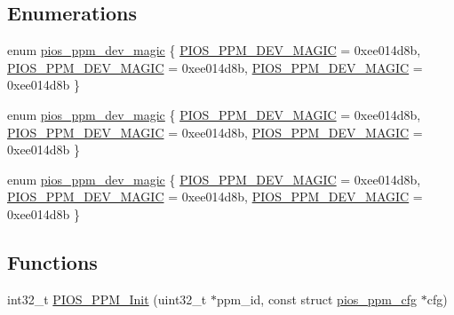 \subsection*{\-Enumerations}
\begin{DoxyCompactItemize}
\item 
enum \hyperlink{group___p_i_o_s___p_p_m_ga6d320e57fe875e76b2fa71a688f865aa}{pios\-\_\-ppm\-\_\-dev\-\_\-magic} \{ \hyperlink{group___p_i_o_s___p_p_m_gga6d320e57fe875e76b2fa71a688f865aaa9a5d0c6d6ee7bcb5178168a65cf9deee}{\-P\-I\-O\-S\-\_\-\-P\-P\-M\-\_\-\-D\-E\-V\-\_\-\-M\-A\-G\-I\-C} =  0xee014d8b, 
\hyperlink{group___p_i_o_s___p_p_m_gga6d320e57fe875e76b2fa71a688f865aaa9a5d0c6d6ee7bcb5178168a65cf9deee}{\-P\-I\-O\-S\-\_\-\-P\-P\-M\-\_\-\-D\-E\-V\-\_\-\-M\-A\-G\-I\-C} =  0xee014d8b, 
\hyperlink{group___p_i_o_s___p_p_m_gga6d320e57fe875e76b2fa71a688f865aaa9a5d0c6d6ee7bcb5178168a65cf9deee}{\-P\-I\-O\-S\-\_\-\-P\-P\-M\-\_\-\-D\-E\-V\-\_\-\-M\-A\-G\-I\-C} =  0xee014d8b
 \}
\item 
enum \hyperlink{group___p_i_o_s___p_p_m_ga6d320e57fe875e76b2fa71a688f865aa}{pios\-\_\-ppm\-\_\-dev\-\_\-magic} \{ \hyperlink{group___p_i_o_s___p_p_m_gga6d320e57fe875e76b2fa71a688f865aaa9a5d0c6d6ee7bcb5178168a65cf9deee}{\-P\-I\-O\-S\-\_\-\-P\-P\-M\-\_\-\-D\-E\-V\-\_\-\-M\-A\-G\-I\-C} =  0xee014d8b, 
\hyperlink{group___p_i_o_s___p_p_m_gga6d320e57fe875e76b2fa71a688f865aaa9a5d0c6d6ee7bcb5178168a65cf9deee}{\-P\-I\-O\-S\-\_\-\-P\-P\-M\-\_\-\-D\-E\-V\-\_\-\-M\-A\-G\-I\-C} =  0xee014d8b, 
\hyperlink{group___p_i_o_s___p_p_m_gga6d320e57fe875e76b2fa71a688f865aaa9a5d0c6d6ee7bcb5178168a65cf9deee}{\-P\-I\-O\-S\-\_\-\-P\-P\-M\-\_\-\-D\-E\-V\-\_\-\-M\-A\-G\-I\-C} =  0xee014d8b
 \}
\item 
enum \hyperlink{group___p_i_o_s___p_p_m_ga6d320e57fe875e76b2fa71a688f865aa}{pios\-\_\-ppm\-\_\-dev\-\_\-magic} \{ \hyperlink{group___p_i_o_s___p_p_m_gga6d320e57fe875e76b2fa71a688f865aaa9a5d0c6d6ee7bcb5178168a65cf9deee}{\-P\-I\-O\-S\-\_\-\-P\-P\-M\-\_\-\-D\-E\-V\-\_\-\-M\-A\-G\-I\-C} =  0xee014d8b, 
\hyperlink{group___p_i_o_s___p_p_m_gga6d320e57fe875e76b2fa71a688f865aaa9a5d0c6d6ee7bcb5178168a65cf9deee}{\-P\-I\-O\-S\-\_\-\-P\-P\-M\-\_\-\-D\-E\-V\-\_\-\-M\-A\-G\-I\-C} =  0xee014d8b, 
\hyperlink{group___p_i_o_s___p_p_m_gga6d320e57fe875e76b2fa71a688f865aaa9a5d0c6d6ee7bcb5178168a65cf9deee}{\-P\-I\-O\-S\-\_\-\-P\-P\-M\-\_\-\-D\-E\-V\-\_\-\-M\-A\-G\-I\-C} =  0xee014d8b
 \}
\end{DoxyCompactItemize}
\subsection*{\-Functions}
\begin{DoxyCompactItemize}
\item 
int32\-\_\-t \hyperlink{group___p_i_o_s___p_p_m_gae783c54c1c2f93d9cb8525c3bacbdc4e}{\-P\-I\-O\-S\-\_\-\-P\-P\-M\-\_\-\-Init} (uint32\-\_\-t $\ast$ppm\-\_\-id, const struct \hyperlink{structpios__ppm__cfg}{pios\-\_\-ppm\-\_\-cfg} $\ast$cfg)
\end{DoxyCompactItemize}
